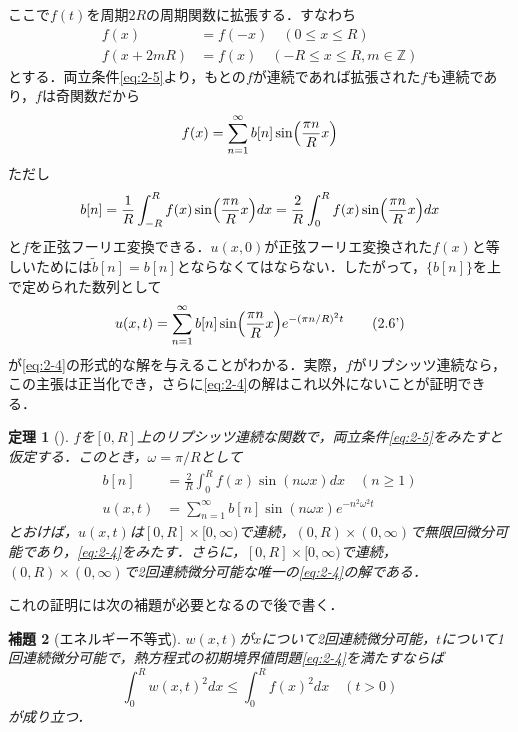 \documentclass[dvipdfmx,a4j,10pt]{jsarticle}
\makeatletter
\theoremstyle{mystyle1}
\newtheorem{theorem}{定理}[section]
\newtheorem{lemma}[theorem]{補題}
\theoremstyle{mystyle3}
\theoremstyle{mystyle4}
\theoremstyle{mystyle6}
\theoremstyle{mystyle2}
\theoremstyle{mystyle5}
\renewenvironment{proof}[1][\proofname]{\par
  \pushQED{\qed}%
  \normalfont
  \topsep6\p@\@plus6\p@ \trivlist
  \item[\hskip\labelsep{\bfseries\sffamily #1}]\ignorespaces
}{%
  \popQED\endtrivlist\@endpefalse
}
\renewcommand\proofname{証明}
\newenvironment{lem}[1][]
{\begin{tcolorbox}[
    enhanced,
    boxrule=0pt,
    arc=0mm,
    frame hidden,
    borderline west={2pt}{-4pt}{yellow!90!black},
    breakable = true
    ]
    \begin{lemma}[#1]
}
{\end{lemma}\end{tcolorbox}}
\newenvironment{thm}[1][]
{\begin{tcolorbox}[
    enhanced,
    boxrule=0pt,
    arc=0mm,
    frame hidden,
    borderline west={2pt}{-4pt}{red},
    breakable = true
    ]
    \begin{theorem}[#1]
}
{\end{theorem}\end{tcolorbox}}
\makeatother
\begin{document}
ここで$f(t)$を周期$2R$の周期関数に拡張する．すなわち
\[
	\begin{split}
		f(x)     & =f(-x)\quad(0\leq x\leq R)                 \\
		f(x+2mR) & =f(x)\quad (-R\leq x\leq R,m\in\mathbb{Z})
	\end{split}
\]
とする．両立条件\eqref{eq:2-5}より，もとの$f$が連続であれば拡張された$f$も連続であり，$f$は奇関数だから
\[
	f(x)=\sum_{n=1}^\infty b[n]\sin\mleft(\frac{\pi n}{R}x\mright)
\]
ただし
\[
	b[n]=\frac{1}{R}\int_{-R}^R f(x)\sin\mleft(\frac{\pi n}{R}x\mright) dx=\frac{2}{R}\int_0^R f(x)\sin\mleft(\frac{\pi n}{R}x\mright) dx
\]
と$f$を正弦フーリエ変換できる．$u(x,0)$が正弦フーリエ変換された$f(x)$と等しいためには$\tilde b[n]=b[n]$とならなくてはならない．したがって，$\{b[n]\}$を上で定められた数列として
\begin{equation}\label{eq:2-6'}
	u(x,t)=\sum_{n=1}^\infty b[n]\sin\mleft(\frac{\pi n}{R}x\mright)e^{-(\pi n/R)^2 t}\tag{2.6'}
\end{equation}
が\eqref{eq:2-4}の形式的な解を与えることがわかる．実際，$f$がリプシッツ連続なら，この主張は正当化でき，さらに\eqref{eq:2-4}の解はこれ以外にないことが証明できる．

\begin{thm}\label{thm:2-5}
	$f$を$[0,R]$上のリプシッツ連続な関数で，両立条件\eqref{eq:2-5}をみたすと仮定する．このとき，$\omega=\pi/R$として
	\[
		\begin{split}
			b[n]&=\frac{2}{R}\int_0^R f(x)\sin(n\omega x)dx\quad(n\geq 1) \\
			u(x,t)&=\sum_{n=1}^\infty b[n]\sin(n\omega x)e^{-n^2\omega^2 t}
		\end{split}
	\]
	とおけば，$u(x,t)$は$[0,R]\times [0,\infty)$で連続，$(0,R)\times(0,\infty)$で無限回微分可能であり，\eqref{eq:2-4}をみたす．さらに，$[0,R]\times [0,\infty)$で連続，$(0,R)\times(0,\infty)$で2回連続微分可能な唯一の\eqref{eq:2-4}の解である．
\end{thm}

\begin{proof}
	これの証明には次の補題が必要となるので後で書く．
\end{proof}

\begin{lem}[エネルギー不等式]\label{lem:2-7}
	$w(x,t)$が$x$について2回連続微分可能，$t$について1回連続微分可能で，熱方程式の初期境界値問題\eqref{eq:2-4}を満たすならば
	\begin{equation}\label{eq:2-8}
		\int_0^R w(x,t)^2 dx\leq \int_0^R f(x)^2 dx\quad(t>0)
	\end{equation}
	が成り立つ．
\end{lem}
\end{document}
